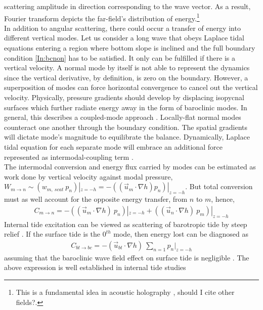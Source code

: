 \documentclass[12pt]{article}
\begin{document}
scattering amplitude in direction corresponding to the wave vector. As a result, Fourier transform 
depicts the far-field's distribution of energy.\footnote{ This is a fundamental idea in acoustic 
holography \citep{williams1999fourier}, should I cite other fields?.}\\
In addition to angular scattering, there could occur a transfer of energy into different vertical 
modes. Let us consider a long wave that obeys Laplace tidal equations entering a region where 
bottom slope is inclined and the full boundary condition \eqref{In:bcnon} has to be satisfied. It 
only can be fulfilled if there is a vertical velocity. A normal mode by itself is not able to 
represent the dynamics since the vertical derivative, by definition, is zero on the boundary. 
However, a superposition of modes can force horizontal convergence to cancel out the vertical 
velocity. Physically, pressure gradients should develop by displacing isopycnal surfaces which 
further radiate energy away in the form of baroclinic modes. In general, this describes a 
coupled-mode approach \citep{griffiths2007internal}. Locally-flat normal modes counteract one 
another through the boundary condition. The spatial gradients will dictate mode's magnitude to 
equilibrate the balance. Dynamically, Laplace tidal equation for each separate mode will embrace an 
additional force represented as intermodal-coupling term \citep{griffiths2007internal, 
kelly2016coupled}.\\
The intermodal conversion and energy flux carried by modes can be estimated as work done by 
vertical velocity against modal pressure, $W_{m \to n} \sim (w_{m,~scat}~p_n)|_{z = 
-h} = -((\vec{u}_m \cdot \nabla h) p_n)|_{z = -h}$. But total conversion must as well account for 
the opposite energy transfer, from $n$ to $m$, hence,
\begin{align}
\label{In:en.trans}
C_{m \to n} = -((\vec{u}_m \cdot \nabla h)~p_n)|_{z = -h} + ((\vec{u}_n \cdot \nabla h)~p_m)|_{z = 
-h}
\end{align}
Internal tide excitation can be viewed as scattering of barotropic tide by steep relief 
\citep{hendershott1981long}. If the surface tide is the $0^{th}$ mode, then energy lost can be 
diagnosed as
\begin{align}
\label{In:bt_bc}
C_{bt \to bc} = -(\vec{u}_{bt} \cdot \nabla h)~\sum_{n = 1} p_n|_{z = -h}
\end{align}
assuming that the baroclinic wave field effect on surface tide is negligible 
\citep{kelly2012cascade}. The above expression is well established in internal tide studies 
\end{document}
